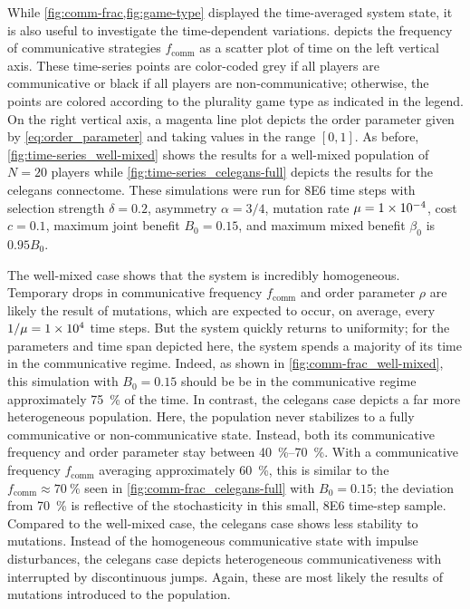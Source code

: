 \documentclass[pdflatex,lineno,referee,sn-mathphys-ay]{sn-jnl}
\begin{document}
While \cref{fig:comm-frac,fig:game-type} displayed
the time-averaged system state,
it is also useful to investigate the time-dependent variations.
 depicts the frequency
of communicative strategies $f_{\text{comm}}$
as a scatter plot of time on the left vertical axis.
These time-series points are color-coded
grey if all players are communicative or
black if all players are non-communicative;
otherwise, the points are colored according
to the plurality game type as indicated in the legend.
On the right vertical axis,
a magenta line plot depicts the order parameter
given by \cref{eq:order_parameter} and
taking values in the range $[0,1]$.
As before, \cref{fig:time-series_well-mixed} shows the results
for a well-mixed population of $N=20$ players
while \cref{fig:time-series_celegans-full} depicts the results
for the \gls{celegans} connectome.
These simulations were run
for \num{8E6} time steps with
selection strength $\delta = 0.2$,
asymmetry $\alpha = 3/4$,
mutation rate $\mu=\num{1E-4}$,
cost $c = \num{0.1}$,
maximum joint benefit $B_0 = 0.15$,
and maximum mixed benefit $\beta_0$ is $\num{0.95} B_0$.

The  well-mixed case
shows that the system is incredibly homogeneous.
Temporary drops in communicative frequency $f_{\text{comm}}$
and order parameter $\rho$ are likely the result of mutations,
which are expected to occur, on average, every $1/\mu = \num{1E4}$ time steps.
But the system quickly returns to uniformity;
for the parameters and time span depicted here,
the system spends a majority of its time in the communicative regime.
Indeed, as shown in \cref{fig:comm-frac_well-mixed},
this simulation with $B_0 = 0.15$ should be be in the communicative regime
approximately \SI{75}{\percent} of the time.
In contrast, the  \gls{celegans} case
depicts a far more heterogeneous population.
Here, the population never stabilizes
to a fully communicative or non-communicative state.
Instead, both its communicative frequency and order parameter
stay between \SIrange{40}{70}{\percent}.
With a communicative frequency $f_{\text{comm}}$ averaging approximately \SI{60}{\percent},
this is similar to the $f_{\text{comm}} \approx \SI{70}{\percent}$ seen
in \cref{fig:comm-frac_celegans-full} with $B_0 = 0.15$;
the deviation from \SI{70}{\percent} is reflective of the
stochasticity in this small, \num{8E6} time-step sample.
Compared to the  well-mixed case,
the \gls{celegans} case shows less stability to mutations.
Instead of the homogeneous communicative state with impulse disturbances,
the \gls{celegans} case depicts heterogeneous communicativeness
with interrupted by discontinuous jumps.
Again, these are most likely the results of mutations introduced
to the population.
\end{document}
